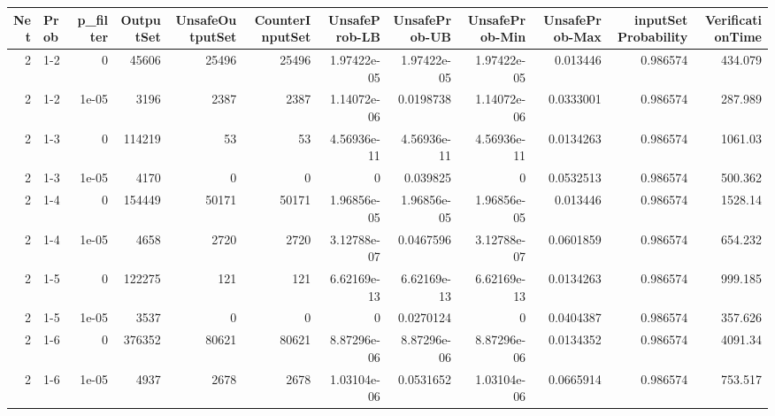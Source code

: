 \begin{tabular}{rlrrrrrrrrrr}
\hline
   Net & Prob   &   p\_filter &   OutputSet &   UnsafeOutputSet &   CounterInputSet &   UnsafeProb-LB &   UnsafeProb-UB &   UnsafeProb-Min &   UnsafeProb-Max &   inputSet Probability &   VerificationTime \\
\hline
     2 & 1-2    &      0     &       45606 &             25496 &             25496 &     1.97422e-05 &     1.97422e-05 &      1.97422e-05 &        0.013446  &               0.986574 &          434.079   \\
     2 & 1-2    &      1e-05 &        3196 &              2387 &              2387 &     1.14072e-06 &     0.0198738   &      1.14072e-06 &        0.0333001 &               0.986574 &          287.989   \\
     2 & 1-3    &      0     &      114219 &                53 &                53 &     4.56936e-11 &     4.56936e-11 &      4.56936e-11 &        0.0134263 &               0.986574 &         1061.03    \\
     2 & 1-3    &      1e-05 &        4170 &                 0 &                 0 &     0           &     0.039825    &      0           &        0.0532513 &               0.986574 &          500.362   \\
     2 & 1-4    &      0     &      154449 &             50171 &             50171 &     1.96856e-05 &     1.96856e-05 &      1.96856e-05 &        0.013446  &               0.986574 &         1528.14    \\
     2 & 1-4    &      1e-05 &        4658 &              2720 &              2720 &     3.12788e-07 &     0.0467596   &      3.12788e-07 &        0.0601859 &               0.986574 &          654.232   \\
     2 & 1-5    &      0     &      122275 &               121 &               121 &     6.62169e-13 &     6.62169e-13 &      6.62169e-13 &        0.0134263 &               0.986574 &          999.185   \\
     2 & 1-5    &      1e-05 &        3537 &                 0 &                 0 &     0           &     0.0270124   &      0           &        0.0404387 &               0.986574 &          357.626   \\
     2 & 1-6    &      0     &      376352 &             80621 &             80621 &     8.87296e-06 &     8.87296e-06 &      8.87296e-06 &        0.0134352 &               0.986574 &         4091.34    \\
     2 & 1-6    &      1e-05 &        4937 &              2678 &              2678 &     1.03104e-06 &     0.0531652   &      1.03104e-06 &        0.0665914 &               0.986574 &          753.517   \\

\end{tabular}

